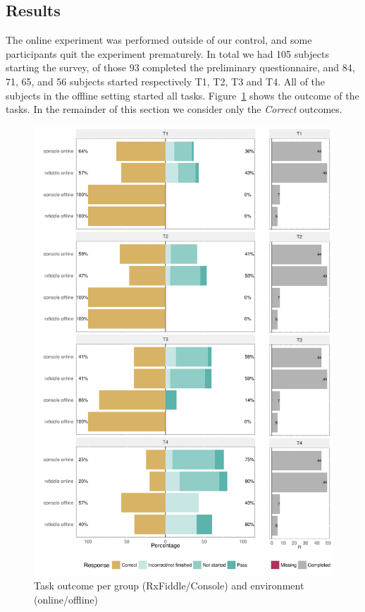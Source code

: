 \subsection{Results}
The online experiment was performed outside of our control, and some participants quit the experiment prematurely. In total we had 105 subjects starting the survey, of those 93 completed the preliminary questionnaire, and 84, 71, 65, and 56 subjects started respectively T1, T2, T3 and T4. All of the subjects in the offline setting started all tasks. Figure~\ref{fig:resultPerTask} shows the outcome of the tasks. In the remainder of this section we consider only the \emph{Correct} outcomes.

\begin{figure}[t]
\includegraphics[width=\columnwidth]{images/resultPerTask.pdf}
\caption{Task outcome per group (RxFiddle/Console) and environment (online/offline)}
\label{fig:resultPerTask}
\end{figure}

